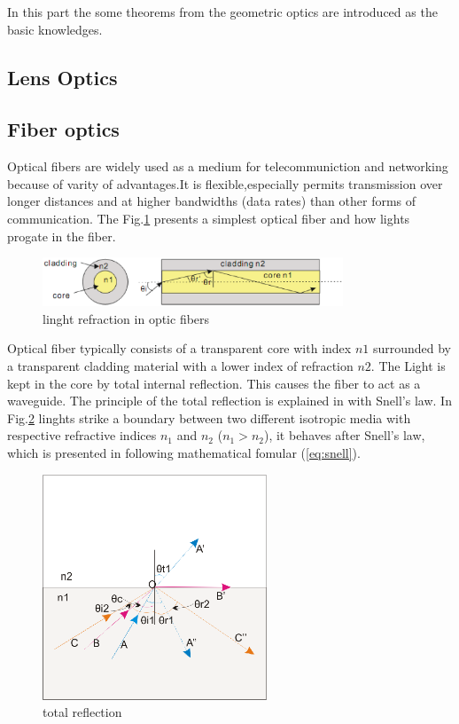 In this part the  some theorems from the geometric optics  are introduced as the basic knowledges.

\subsection{Lens Optics}


\subsection{Fiber optics}
Optical fibers are widely used as a medium for telecommuniction and networking because of varity of advantages.It is flexible,especially permits transmission over longer distances and at higher bandwidths (data rates) than other forms of communication. The Fig.\ref{fig:opticfiber} presents a simplest optical fiber and how lights progate in the fiber. 

\begin{figure}[httbp]
\centering
\includegraphics[width=0.8\textwidth]{bilder/opticfiber}
\caption{linght refraction in optic fibers}
\label{fig:opticfiber}
\end{figure}

Optical fiber typically consists of a transparent core with index $n1$ surrounded by a transparent cladding material with a lower index of refraction $n2$. The Light is kept in the core by total internal reflection. This causes the fiber to act as a waveguide.
The principle of the total reflection is explained in \cite{script_FT_TET} with Snell's law. In Fig.\ref{fig:totalreflection} linghts strike a boundary between two different isotropic media with respective refractive indices $n_{1}$ and $n_{2}$ ($n_{1}>n_{2}$), it behaves after Snell's law, which is presented in following mathematical fomular (\ref{eq:snell}).
\begin{figure}[httbp]
\centering
\includegraphics[width=0.6\textwidth]{bilder/totalreflection}
\caption{total reflection}
\label{fig:totalreflection}
\end{figure}

